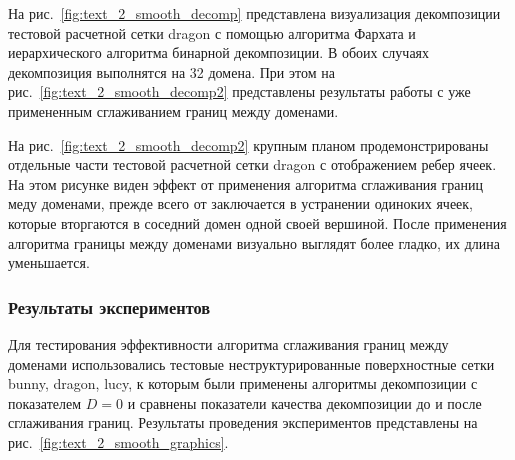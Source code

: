 На рис.~\ref{fig:text_2_smooth_decomp} представлена визуализация декомпозиции тестовой расчетной сетки dragon с помощью алгоритма Фархата и иерархического алгоритма бинарной декомпозиции.
В обоих случаях декомпозиция выполнятся на 32 домена.
При этом на рис.~\ref{fig:text_2_smooth_decomp2} представлены результаты работы с уже примененным сглаживанием границ между доменами.

На рис.~\ref{fig:text_2_smooth_decomp2} крупным планом продемонстрированы отдельные части тестовой расчетной сетки dragon с отображением ребер ячеек.
На этом рисунке виден эффект от применения алгоритма сглаживания границ меду доменами, прежде всего от заключается в устранении одиноких ячеек, которые вторгаются в соседний домен одной своей вершиной.
После применения алгоритма границы между доменами визуально выглядят более гладко, их длина уменьшается.

\subsubsection{Результаты экспериментов}

Для тестирования эффективности алгоритма сглаживания границ между доменами использовались тестовые неструктурированные поверхностные сетки bunny, dragon, lucy, к которым были применены алгоритмы декомпозиции с показателем $D = 0$\label{term:decomp_neravn6} и сравнены показатели качества декомпозиции до и после сглаживания границ.
Результаты проведения экспериментов представлены на рис.~\ref{fig:text_2_smooth_graphics}.

